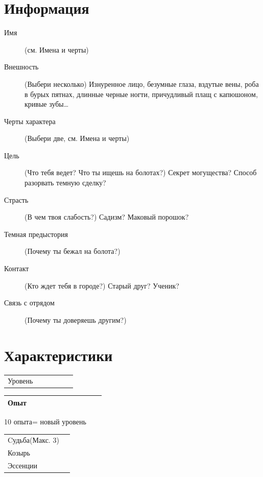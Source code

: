 \documentclass[10pt,twoside]{report}
\begin{document}
\section*{Информация}
\begin{description}
\item[Имя]{\footnotesize (см. Имена и черты)}
\item[Внешность] {\footnotesize (Выбери несколько) Изнуренное лицо,
    безумные глаза,  вздутые вены, роба в бурых пятнах, длинные черные
    ногти, причудливый   плащ с капюшоном, кривые зубы\ldots}

\item[Черты характера]{\footnotesize (Выбери две, см. Имена и черты)}

\item[Цель] {\footnotesize (Что тебя ведет? Что ты ищешь на болотах?)
    Секрет   могущества? Способ разорвать темную сделку?}

\item[Страсть]{\footnotesize (В чем твоя слабость?) Садизм? Маковый порошок?}

\item[Темная предыстория]{\footnotesize (Почему ты бежал на болота?)}

\item[Контакт] {\footnotesize (Кто ждет тебя в городе?) Старый друг? Ученик?}

\item[Связь с отрядом]{\footnotesize (Почему ты доверяешь другим?)}
\end{description}
\pagebreak

\section*{Характеристики}

\begin{center}
  \begin{tabular}{l c}
     Уровень & \verb!        !\\ 
  \end{tabular}

\begin{tabular}{|l|c|c|c|c|c|c|c|c|c|c|}
  \hline
  Опыт & & & & & & & & & &\\ \hline
\end{tabular}

{\footnotesize 10 опыта= новый уровень}
\end{center}
\begin{tabular}{l c}
  Cудьба{\tiny(Макс. 3)} & \\
  Козырь & \\
  Эссенции & \\ 
\end{tabular}
\end{document}
